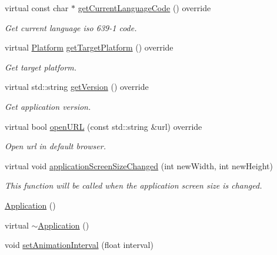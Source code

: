 \begin{DoxyCompactItemize}
virtual const char $\ast$ \hyperlink{classApplication_a47bfc4cd5a784ce46bd05e727b2e8781}{get\+Current\+Language\+Code} () override
\begin{DoxyCompactList}\small\item\em Get current language iso 639-\/1 code. \end{DoxyCompactList}\item 
\mbox{\label{classApplication_ab28ac2b31e12cd16e157eeee710ef4a4}} 
virtual \hyperlink{classApplicationProtocol_aff3819b9b879107dc9c207d0e7ae36d1}{Platform} \hyperlink{classApplication_ab28ac2b31e12cd16e157eeee710ef4a4}{get\+Target\+Platform} () override
\begin{DoxyCompactList}\small\item\em Get target platform. \end{DoxyCompactList}\item 
\mbox{\label{classApplication_ade1db7f4ab2a9e2b1aeb7950ac481ebd}} 
virtual std\+::string \hyperlink{classApplication_ade1db7f4ab2a9e2b1aeb7950ac481ebd}{get\+Version} () override
\begin{DoxyCompactList}\small\item\em Get application version. \end{DoxyCompactList}\item 
virtual bool \hyperlink{classApplication_a13ccf5ab932de8a22255b56d085bed59}{open\+U\+RL} (const std\+::string \&url) override
\begin{DoxyCompactList}\small\item\em Open url in default browser. \end{DoxyCompactList}\item 
virtual void \hyperlink{classApplication_a099008d482b87b47440b11ecb536d5e3}{application\+Screen\+Size\+Changed} (int new\+Width, int new\+Height)
\begin{DoxyCompactList}\small\item\em This function will be called when the application screen size is changed. \end{DoxyCompactList}\item 
\hyperlink{classApplication_afa8cc05ce6b6092be5ecdfdae44e05f8}{Application} ()
\item 
virtual \hyperlink{classApplication_a20573928a0d53fb96d929513bc5acde6}{$\sim$\+Application} ()
\item 
void \hyperlink{classApplication_a3160c4ee81ef7fba87d7299991998d5b}{set\+Animation\+Interval} (float interval)

\end{DoxyCompactItemize}
